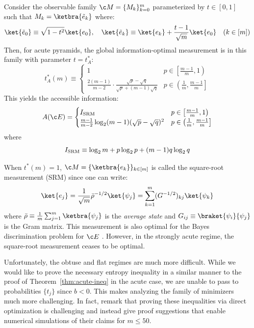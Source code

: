 \documentclass[11pt]{article}
\begin{document}
\begin{corollary}
   Consider the observable family $\c M =\{M_k\}_{k=0}^m$ parameterized by $t\in [0,1]$ such that $M_k=\ketbra{\Tilde e_k}$ where:
   \begin{equation}\label{eq:acute-M}
   \ket{\Tilde e_0}\equiv \sqrt{1-t^2}\ket{e_0},\quad 
       \ket{\Tilde e_k}\equiv \ket{e_k}+\frac{t-1}{\sqrt m}\ket{e_0}\quad (k\in [m])
   \end{equation}
   Then, for acute pyramids, the global information-optimal measurement is in this family with parameter $t=t^*_{A}$:
   \begin{equation}
       t^*_A(m)\equiv \begin{cases}
           1 & p\in \left[\frac{m-1}{m},1\right)\\
           \frac{2(m-1)}{m-2}\cdot \frac{\sqrt p-\sqrt q}{\sqrt p+(m-1)\sqrt q} & p\in \left(\frac 1 m ,\frac{m-1}{m}\right]
       \end{cases}
   \end{equation}
   This yields the accessible information:
   \begin{equation}
       A({\c E})=\begin{cases}
           I_{\rm SRM} & p\in \left[\frac{m-1}{m},1\right)\\
           \frac{m-1}{m-2}\log_2(m-1)(\sqrt p-\sqrt q)^2 &  p\in \left(\frac 1 m ,\frac{m-1}{m}\right]
       \end{cases}
   \end{equation}
   where 
   \begin{equation}
       I_{\rm SRM}\equiv \log_2 m  +p\log_2 p+(m-1)q\log_2 q 
   \end{equation}
\end{corollary}
When $t^*(m)=1$, $\c M =\{\ketbra{e_k}\}_{k\in[m]}$ is called the square-root measurement (SRM) since one can write:
\begin{equation}
    \ket{e_j}=\frac 1 {\sqrt m}\bar \rho ^{-1/2}\ket{\psi_j }=\sum_{k=1}^{m}(G^{-1/2})_{kj}\ket{\psi_k}
\end{equation}
where $\bar \rho \equiv \frac 1 m \sum_{j=1}^m \ketbra{\psi_j}$ is the \textit{average state} and $G_{ij}\equiv \braket{\psi_i}{\psi_j}$ is the Gram matrix. This measurement is also optimal for the Bayes discrimination problem for $\c E $ \citep{helstrom1976quantum}. However, in the strongly acute regime, the square-root measurement ceases to be optimal. 

Unfortunately, the obtuse and flat regimes are much more difficult. While we would like to prove the necessary entropy inequality in a similar manner to the proof of Theorem~\ref{thm:acute-ineq} in the acute case, we are unable to pass to probabilities $\{t_j\}$ since $b<0$. This makes analyzing the family of minimizers much more challenging. In fact, \citep{holevo2025quantum} remark that proving these inequalities via direct optimization is challenging and instead give proof suggestions that enable numerical simulations of their claims for $m\leq 50$. 
\end{document}
